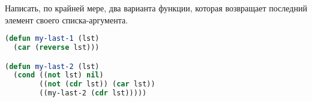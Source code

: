 Написать, по крайней мере, два варианта функции, которая возвращает
последний элемент своего списка-аргумента.

\begin{lstlisting}[language=Lisp]
(defun my-last-1 (lst)
  (car (reverse lst)))

(defun my-last-2 (lst)
  (cond ((not lst) nil)
        ((not (cdr lst)) (car lst))
        ((my-last-2 (cdr lst)))))
\end{lstlisting}

